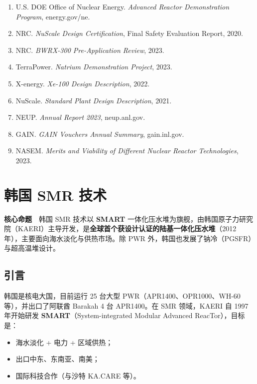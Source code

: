 \documentclass[
  UTF8,
  scheme=plain,
  fontsize=10pt,
  openany
]{ctexbook}
\begin{document}
\begin{enumerate}
\def\labelenumi{\arabic{enumi}.}
\tightlist
\item
  U.S. DOE Office of Nuclear Energy. \emph{Advanced Reactor
  Demonstration Program}, energy.gov/ne.
\item
  NRC. \emph{NuScale Design Certification}, Final Safety Evaluation
  Report, 2020.
\item
  NRC. \emph{BWRX-300 Pre-Application Review}, 2023.
\item
  TerraPower. \emph{Natrium Demonstration Project}, 2023.
\item
  X-energy. \emph{Xe-100 Design Description}, 2022.
\item
  NuScale. \emph{Standard Plant Design Description}, 2021.
\item
  NEUP. \emph{Annual Report 2023}, neup.anl.gov.
\item
  GAIN. \emph{GAIN Vouchers Annual Summary}, gain.inl.gov.
\item
  NASEM. \emph{Merits and Viability of Different Nuclear Reactor
  Technologies}, 2023.
\end{enumerate}

\cleardoublepage

\chapter{韩国 SMR 技术}\label{ux97e9ux56fd-smr-ux6280ux672f}

\begin{epigraph}

\textbf{核心命题}　韩国 SMR 技术以 \textbf{SMART}
一体化压水堆为旗舰，由韩国原子力研究院（KAERI）主导开发，是\textbf{全球首个获设计认证的陆基一体化压水堆}（2012
年），主要面向海水淡化与供热市场。除 PWR
外，韩国也发展了钠冷（PGSFR）与超高温堆设计。

\end{epigraph}

\section{引言}\label{ux5f15ux8a00-14}

韩国是核电大国，目前运行 25 台大型 PWR（APR1400、OPR1000、WH-60
等），并出口了阿联酋 Barakah 4 台 APR1400。在 SMR 领域，KAERI 自 1997
年开始研发 \textbf{SMART}（System-integrated Modular Advanced
ReacTor），目标是：

\begin{itemize}
\tightlist
\item
  海水淡化 + 电力 + 区域供热；
\item
  出口中东、东南亚、南美；
\item
  国际科技合作（与沙特 KA.CARE 等）。
\end{itemize}
\end{document}
